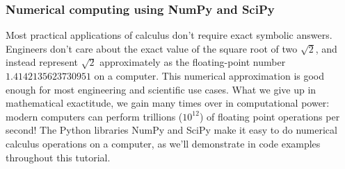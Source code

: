 


		\subsubsection{Numerical computing using NumPy and SciPy}

			Most practical applications of calculus don't require exact symbolic answers.
			Engineers don't care about the exact value of the square root of two $\sqrt{2}$,
			and instead represent $\sqrt{2}$ approximately as the floating-point number
			$1.4142135623730951$ on a computer.
			This numerical approximation is good enough for most engineering and scientific use cases.
			What we give up in mathematical exactitude,
			we gain many times over in computational power:
			modern computers can perform trillions ($10^{12}$) of floating point operations per second!
			The Python libraries NumPy and SciPy make it easy to do numerical calculus operations on a computer,
			as we'll demonstrate in code examples throughout this tutorial.

